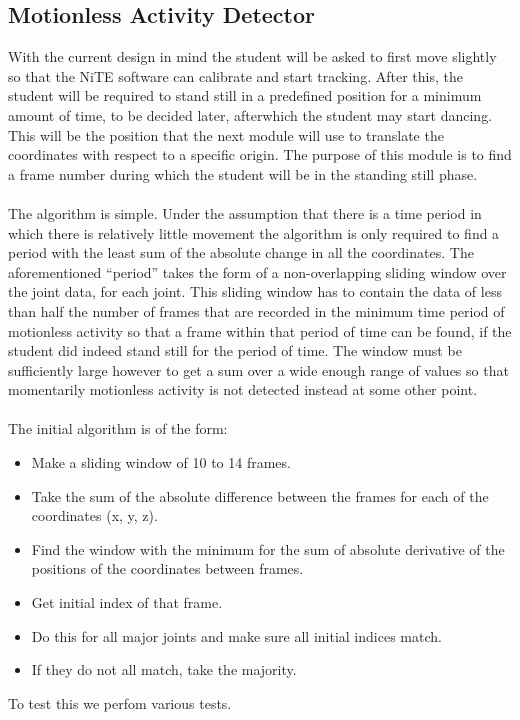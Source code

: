 \documentclass[10pt]{article}
\begin{document}
\subsection{Motionless Activity Detector}
\noindent 
With the current design in mind the student will be asked to first move slightly so that the NiTE software can calibrate and start tracking. After this, the student will be required to stand still in a predefined position for a minimum amount of time, to be decided later, afterwhich the student may start dancing. This will be the position that the next module will use to translate the coordinates with respect to a specific origin. The purpose of this module is to find a frame number during which the student will be in the standing still phase.\\\\
\noindent 
The algorithm is simple. Under the assumption that there is a time period in which there is relatively little movement the algorithm is only required to find a period with the least sum of the absolute change in all the coordinates. The aforementioned ``period'' takes the form of a non-overlapping sliding window over the joint data, for each joint. This sliding window has to contain the data of less than half the number of frames that are recorded in the minimum time period of motionless activity so that a frame within that period of time can be found, if the student did indeed stand still for the period of time. The window must be sufficiently large however to get a sum over a wide enough range of values so that momentarily motionless activity is not detected instead at some other point.\\\\
\noindent
The initial algorithm is of the form:
\begin{itemize}
\setlength{\itemsep}{1pt}
\setlength{\parskip}{0pt}
\setlength{\parsep}{0pt}
	\item Make a sliding window of 10 to 14 frames.
	\item Take the sum of the absolute difference between the frames for each of the coordinates (x, y, z).
	\item Find the window with the minimum for the sum of absolute derivative of the positions of the coordinates between frames.
	\item Get initial index of that frame.
\item Do this for all major joints and make sure all initial indices match.
\item If they do not all match, take the majority. 
\end{itemize}
\noindent
To test this we perfom various tests.
\end{document}
